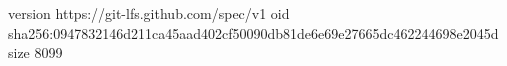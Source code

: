 version https://git-lfs.github.com/spec/v1
oid sha256:0947832146d211ca45aad402cf50090db81de6e69e27665dc462244698e2045d
size 8099
